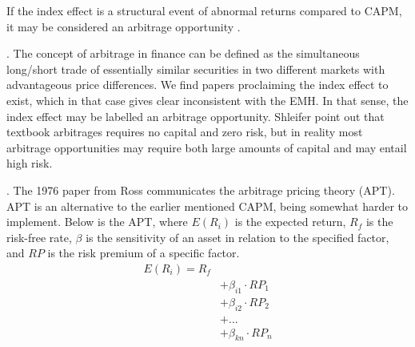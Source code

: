 


If the index effect is a structural event of abnormal returns compared to CAPM, it may be considered an arbitrage opportunity \parencite{shleifer-the-limits-of-arbitrage}.  



\textcite{shleifer-the-limits-of-arbitrage}.
The concept of arbitrage in finance can be defined as the simultaneous long/short trade of essentially similar securities in two different markets with advantageous price differences. We find papers proclaiming the index effect to exist, which in that case gives clear inconsistent with the EMH. In that sense, the index effect may be labelled an arbitrage opportunity. Shleifer point out that textbook arbitrages requires no capital and zero risk, but in reality most arbitrage opportunities may require both large amounts of capital and may entail high risk. 

\textcite{ross-arbitrage}.
The 1976 paper from Ross communicates the arbitrage pricing theory (APT). APT is an alternative to the earlier mentioned CAPM, being somewhat harder to implement. Below is the APT, where $E(R_i)$ is the expected return, $R_f$ is the risk-free rate, $\beta$ is the sensitivity of an asset in relation to the specified factor, and $RP$ is the risk premium of a specific factor. 
\begin{align}
    E(R_i)=R_f \\
    &+\beta_{i1} \cdot RP_1 \\
    &+ \beta_{i2} \cdot RP_2 \\
    &+ ... \\
    &+ \beta_{kn} \cdot RP_n
\end{align}






